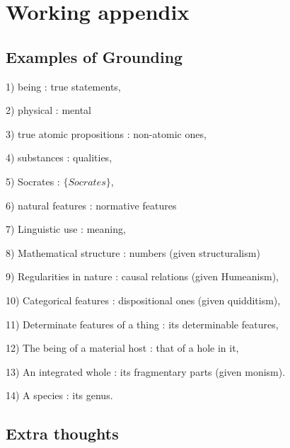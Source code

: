 \section{Working appendix}
\subsection{Examples of Grounding}
1) being      : true statements, 

2) physical   : mental

3) true atomic propositions : non-atomic ones, 

4) substances : qualities, 

5) Socrates   : $\{Socrates\}$, 

6) natural features : normative features 

7) Linguistic use : meaning, 

8) Mathematical structure : numbers (given structuralism) 

9) Regularities in nature : causal relations (given Humeanism), 

10) Categorical features : dispositional ones (given quidditism), 

11) Determinate features of a thing : its determinable features, 

12) The being of a material host : that of a hole in it, 

13) An integrated whole : its fragmentary parts (given monism). 

14) A species : its genus.

\subsection{Extra thoughts}


